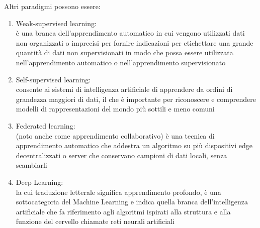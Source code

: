 \documentclass[10pt,oneside,a4paper]{article}
\begin{document}
	Altri paradigmi possono essere:
	\begin{enumerate}
		\item Weak-supervised learning:\\
			è una branca dell'apprendimento automatico in cui vengono utilizzati
			dati non organizzati o imprecisi per fornire indicazioni per etichettare una grande quantità di
			dati non supervisionati in modo che possa essere utilizzata
			nell'apprendimento automatico o nell'apprendimento supervisionato
		\item Self-supervised learning:\\
			consente ai sistemi di intelligenza artificiale di apprendere da ordini di
			grandezza maggiori di dati, il che è importante per riconoscere e comprendere modelli di
			rappresentazioni del mondo più sottili e meno comuni
		\item Federated learning:\\
			(noto anche come apprendimento collaborativo) è una tecnica di
			apprendimento automatico che addestra un algoritmo su più dispositivi edge decentralizzati o
			server che conservano campioni di dati locali, senza scambiarli
		\item Deep Learning:\\
			la cui traduzione letterale significa apprendimento profondo, è una
			sottocategoria del Machine Learning e indica quella branca dell’intelligenza artificiale che fa riferimento agli algoritmi
			ispirati alla struttura e alla funzione del cervello chiamate reti neurali artificiali
	\end{enumerate}
	
	
	
\end{document}
